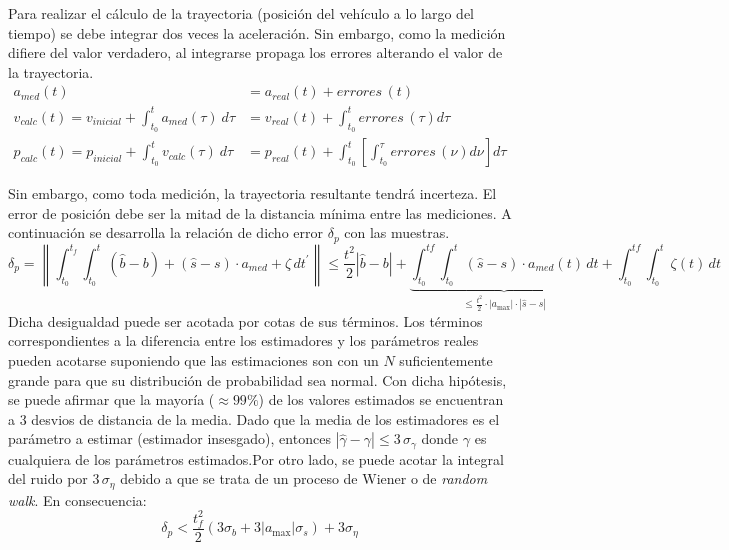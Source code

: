 
	Para realizar el cálculo de la trayectoria (posición del vehículo a lo largo del tiempo) se debe integrar dos veces la aceleración. Sin embargo, como la medición difiere del valor verdadero, al integrarse propaga los errores alterando el valor de la trayectoria.
	\begin{align*}
		{a}_{med}(t) &= {a}_{real}(t) + {\textit{errores}}\,(t)\\
		v_{calc}(t) = v_{inicial} + \int^t_{t_0} a_{med}(\tau)\: d\tau &= v_{real}(t) + \int^t_{t_0} \textit{errores}\,(\tau) d\tau \\
		p_{calc}(t) = p_{inicial} + \int^t_{t_0} v_{calc}(\tau)\: d\tau &= p_{real}(t) + \int^t_{t_0}\left[\int^\tau_{t_0} \textit{errores}\,(\nu) d\nu\right] d\tau %
	\end{align*}

	Sin embargo, como toda medición, la trayectoria resultante tendrá incerteza. El error de posición debe ser la mitad de la distancia mínima entre las mediciones. A continuación se desarrolla la relación de dicho error $\delta_p$ con las muestras.
	\begin{equation*}
		\delta_p = \left\|\int^{t_f}_{t_0}\int^{t}_{t_0} (\hat{b}-{b}) + (\hat{s} - s) \cdot a_{med} + \zeta \, dt^{'}\right\| \leq \frac{t^2}{2} |\hat{b}-b| + \underbrace{\int^{tf}_{t_0}\int^t_{t_0}(\hat{s}-s)\cdot a_{med}(t) \, dt}_{\leq\frac{t^2}{2}\cdot|a_{\max}|\cdot|\hat{s}-s|} + \int^{tf}_{t_0}\int^t_{t_0}\zeta(t) \, dt
	\end{equation*}
	Dicha desigualdad puede ser acotada por cotas de sus términos. Los términos correspondientes a la diferencia entre los estimadores y los parámetros reales pueden acotarse suponiendo que las estimaciones son con un $N$ suficientemente grande para que su distribución de probabilidad sea normal. Con dicha hipótesis, se puede afirmar que la mayoría ($\approx 99\%$) de los valores estimados se encuentran a 3 desvios de distancia de la media. Dado que la media de los estimadores es el parámetro a estimar (estimador insesgado), entonces $|\hat{\gamma} - \gamma|\leq 3\,\sigma_\gamma$ donde $\gamma$ es cualquiera de los parámetros estimados.Por otro lado, se puede acotar la integral del ruido por $3\,\sigma_\eta$ debido a que se trata de un proceso de Wiener o de \emph{random walk}. En consecuencia:
	\begin{equation*}
		\delta_p < \frac{t^2_f}{2} (3\sigma_b  + 3|a_{\max}|\sigma_s) + 3\sigma_\eta %
	\end{equation*}

